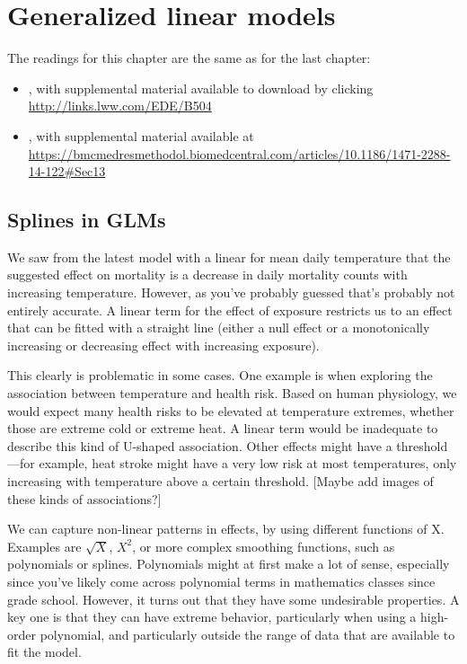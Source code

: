 \documentclass[
]{book}
\providecommand{\tightlist}{%
  \setlength{\itemsep}{0pt}\setlength{\parskip}{0pt}}
\begin{document}
\hypertarget{generalized-linear-models}{%
\chapter{Generalized linear models}\label{generalized-linear-models}}

The readings for this chapter are the same as for the last chapter:

\begin{itemize}
\tightlist
\item
  \citet{vicedo2019hands}, with supplemental material available to download by
  clicking \url{http://links.lww.com/EDE/B504}
\item
  \citet{armstrong2014conditional}, with supplemental material available at
  \url{https://bmcmedresmethodol.biomedcentral.com/articles/10.1186/1471-2288-14-122\#Sec13}
\end{itemize}

\hypertarget{splines-in-glms}{%
\section{Splines in GLMs}\label{splines-in-glms}}

We saw from the latest model with a linear for mean daily temperature that the
suggested effect on mortality is a decrease in daily mortality counts with
increasing temperature. However, as you've probably guessed that's probably not
entirely accurate. A linear term for the effect of exposure restricts us to an
effect that can be fitted with a straight line (either a null effect or a
monotonically increasing or decreasing effect with increasing exposure).

This clearly is problematic in some cases. One example is when exploring the
association between temperature and health risk. Based on human physiology,
we would expect many health risks to be elevated at temperature extremes,
whether those are extreme cold or extreme heat. A linear term would be
inadequate to describe this kind of U-shaped association. Other effects might
have a threshold---for example, heat stroke might have a very low risk at
most temperatures, only increasing with temperature above a certain threshold.
{[}Maybe add images of these kinds of associations?{]}

We can
capture non-linear patterns in effects, by using different functions of X.
Examples are \(\sqrt{X}\), \(X^{2}\), or more complex smoothing functions, such as
polynomials or splines. Polynomials might at first make a lot of sense,
especially since you've likely come across polynomial terms in mathematics
classes since grade school. However, it turns out that they have some undesirable
properties. A key one is that they can have extreme behavior, particularly
when using a high-order polynomial, and particularly outside the range of
data that are available to fit the model.
\end{document}
